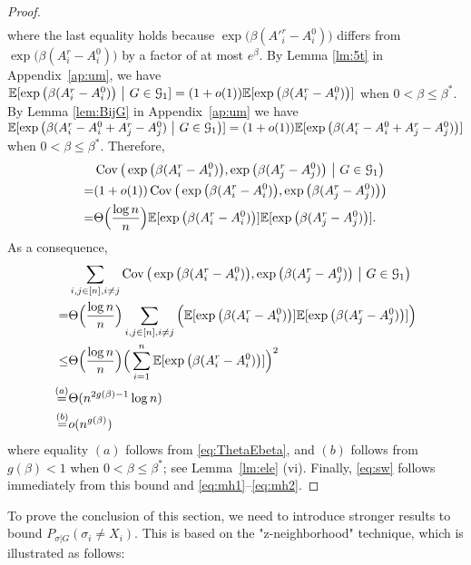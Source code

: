 \documentclass{article}
\begin{document}
\begin{proof}
\begin{align*}
\end{align*} 
where the last equality holds because $\exp\big(\beta (A'^r_i-A^0_i) \big)$ differs from $\exp\big(\beta (A^r_i-A^0_i) \big)$  by a factor of at most $e^{\beta}$. 
By Lemma \ref{lm:5t} in Appendix~\ref{ap:um}, we have $\mathbb{E}[  \exp\big(\beta (A^r_i-A^0_i) \big) ~\big|~ G\in\mathcal{G}_1 ] 
= (1+o(1)) \mathbb{E} [  \exp\big(\beta (A^r_i-A^0_i) \big) ]$ when $0<\beta\le\beta^\ast$.
By Lemma \ref{lem:BijG} in Appendix~\ref{ap:um} we have $\mathbb{E}[\exp\big(\beta (A^r_i-A^0_i+A^r_j-A^0_j) ~\big|~ G\in\mathcal{G}_1 \big)] = (1+o(1)) \mathbb{E}[\exp\big(\beta (A^r_i-A^0_i+A^r_j-A^0_j) \big)]$ when $0<\beta\le\beta^\ast$.
Therefore,
\begin{align*}
& \operatorname{Cov} \big(\exp\big(\beta (A^r_i-A^0_i) \big), \exp\big(\beta (A^r_j-A^0_j)  \big) ~\big|~ G\in\mathcal{G}_1 \big) \\
= & (1+o(1)) \operatorname{Cov} \big(\exp\big(\beta (A^r_i-A^0_i) \big), \exp\big(\beta (A^r_j-A^0_j)  \big) \big) \\
= & \Theta\Big( \frac{\log n}{n} \Big) \mathbb{E}[\exp\big(\beta (A^r_i-A^0_i) \big)] \mathbb{E}[\exp\big(\beta (A^r_j-A^0_j) \big)] .
\end{align*}
As a consequence,
\begin{align*}
& \sum_{i,j\in[n],i\neq j}
\operatorname{Cov} \big(\exp\big(\beta (A^r_i-A^0_i) \big), \exp\big(\beta (A^r_j-A^0_j) \big) ~\big|~ G\in\mathcal{G}_1 \big) \\
= & \Theta\Big( \frac{\log n}{n} \Big) \sum_{i,j\in[n],i\neq j} \Big( \mathbb{E}[\exp\big(\beta (A^r_i-A^0_i) \big)] \mathbb{E}[\exp\big(\beta (A^r_j-A^0_j) \big)] \Big) \\
\le & \Theta\Big( \frac{\log n}{n} \Big)
\Big(\sum_{i=1}^n  \mathbb{E}[\exp\big(\beta (A^r_i-A^0_i) \big)] \Big)^2 \\
\overset{(a)}{=} & \Theta(n^{2g(\beta)-1} \log n) \\
\overset{(b)}{=} & o(n^{g(\beta)})
\end{align*}
where equality $(a)$ follows from \eqref{eq:ThetaEbeta}, and $(b)$ follows from $g(\beta)<1$ when $0<\beta\le\beta^\ast$; see Lemma~\ref{lm:ele} (vi).
Finally, \eqref{eq:sw} follows immediately from this bound and \eqref{eq:mh1}--\eqref{eq:mh2}.
\end{proof}

To prove the conclusion of this section, we need to introduce stronger results to bound
$P_{\sigma | G}(\sigma_i \neq X_i)$. This is based on the "z-neighborhood" technique, which is illustrated as follows:
\end{document}

